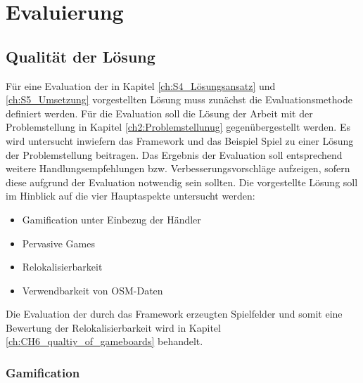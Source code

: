\chapter{Evaluierung}
\label{ch:S6_Evaluierung}

\section{Qualität der Lösung}
\label{ch:CH6_qualtiy_of_solution}

Für eine Evaluation der in Kapitel \ref{ch:S4_Lösungsansatz} und \ref{ch:S5_Umsetzung} vorgestellten Lösung muss zunächst die Evaluationsmethode definiert werden. Für die Evaluation soll die Lösung der Arbeit mit der Problemstellung in Kapitel \ref{ch2:Problemstellunug} gegenübergestellt werden. Es wird untersucht inwiefern das Framework und das Beispiel Spiel zu einer Lösung der Problemstellung beitragen. Das Ergebnis der Evaluation soll entsprechend weitere Handlungsempfehlungen bzw. Verbesserungsvorschläge aufzeigen, sofern diese aufgrund der Evaluation notwendig sein sollten. 
Die vorgestellte Lösung soll im Hinblick auf die vier Hauptaspekte untersucht werden:

\begin{itemize}

\item Gamification unter Einbezug der Händler
\item Pervasive Games
\item Relokalisierbarkeit
\item Verwendbarkeit von OSM-Daten

\end{itemize}

Die Evaluation der durch das Framework erzeugten Spielfelder und somit eine Bewertung der Relokalisierbarkeit wird in Kapitel \ref{ch:CH6_qualtiy_of_gameboards} behandelt.


\subsection*{Gamification}

